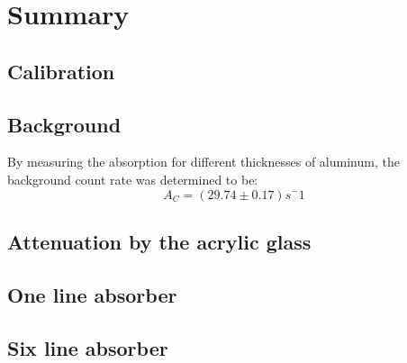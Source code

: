 \section{Summary}
\subsection{Calibration}

\subsection{Background}
By measuring the absorption for different thicknesses of aluminum, the background count rate was determined to be:
\begin{equation*}
A_C= (29.74\pm0.17)s^-1
\end{equation*}	
\subsection{Attenuation by the acrylic glass}

\subsection{One line absorber}

\subsection{Six line absorber}